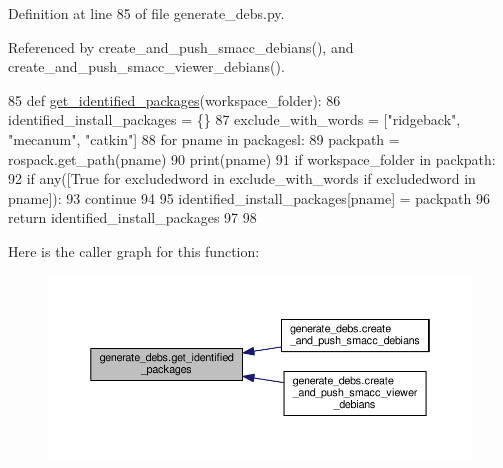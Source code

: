 Definition at line 85 of file generate\+\_\+debs.\+py.



Referenced by create\+\_\+and\+\_\+push\+\_\+smacc\+\_\+debians(), and create\+\_\+and\+\_\+push\+\_\+smacc\+\_\+viewer\+\_\+debians().


\begin{DoxyCode}
85 \textcolor{keyword}{def }\hyperlink{namespacegenerate__debs_aa91b87c6d9c3ed04015845cc9298431a}{get\_identified\_packages}(workspace\_folder):
86     identified\_install\_packages = \{\}
87     exclude\_with\_words = [\textcolor{stringliteral}{"ridgeback"}, \textcolor{stringliteral}{"mecanum"}, \textcolor{stringliteral}{"catkin"}]
88     \textcolor{keywordflow}{for} pname \textcolor{keywordflow}{in} packagesl:
89         packpath = rospack.get\_path(pname)
90         print(pname)
91         \textcolor{keywordflow}{if} workspace\_folder \textcolor{keywordflow}{in} packpath:
92             \textcolor{keywordflow}{if} any([\textcolor{keyword}{True} \textcolor{keywordflow}{for} excludedword \textcolor{keywordflow}{in} exclude\_with\_words \textcolor{keywordflow}{if} excludedword \textcolor{keywordflow}{in} pname]):
93                 \textcolor{keywordflow}{continue}
94 
95             identified\_install\_packages[pname] = packpath
96     \textcolor{keywordflow}{return} identified\_install\_packages
97 
98 
\end{DoxyCode}


Here is the caller graph for this function\+:\nopagebreak
\begin{figure}[H]
\begin{center}
\leavevmode
\includegraphics[width=350pt]{namespacegenerate__debs_aa91b87c6d9c3ed04015845cc9298431a_icgraph}
\end{center}
\end{figure}


